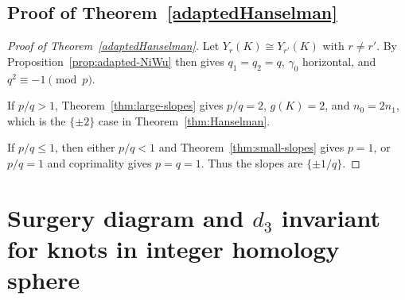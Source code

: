 \documentclass[12pt]{amsart}
\theoremstyle{definition}
\theoremstyle{definition}
\begin{document}
\subsection{Proof of Theorem~\ref{adaptedHanselman}}

\begin{proof}[Proof of Theorem~\ref{adaptedHanselman}]
Let $Y_r(K)\cong Y_{r'}(K)$ with $r\ne r'$.  By   Proposition~\ref{prop:adapted-NiWu}
then gives $q_1=q_2=q$, $\gamma_0$ horizontal, and
$q^2\equiv -1\pmod p$.

If $p/q>1$, Theorem~\ref{thm:large-slopes} gives $p/q=2$, $g(K)=2$, and
$n_0=2 n_1$, which is the $\{\pm2\}$ case in
Theorem~\ref{thm:Hanselman}.

If $p/q\le 1$, then either $p/q<1$ and Theorem~\ref{thm:small-slopes} gives
$p=1$, or $p/q=1$ and coprimality  gives $p=q=1$.  Thus the slopes are
$\{\pm1/q\}$.  
\end{proof}

\section{Surgery diagram and $d_{3}$ invariant for knots in integer homology sphere}
\normalfont
\end{document}
